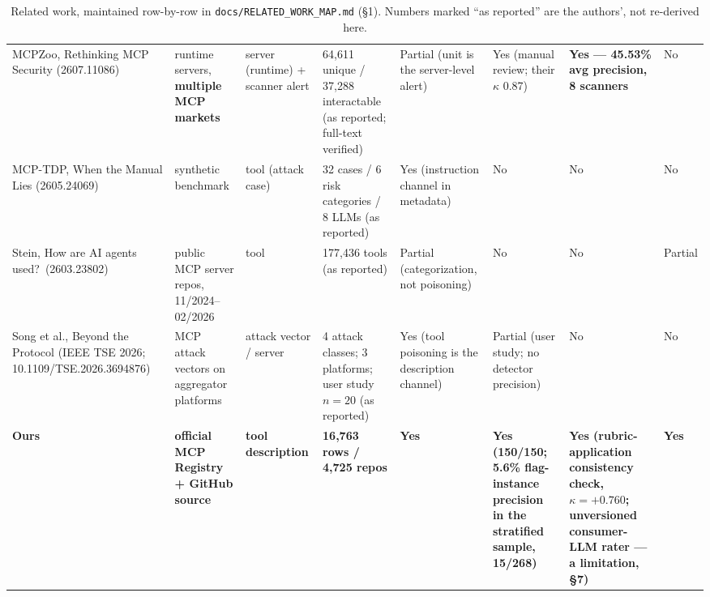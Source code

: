 \documentclass[10pt,conference]{IEEEtran}
\begin{document}
\begin{table}[!t]
\begin{tabular}{@{}p{}p{}p{}p{}p{}p{}p{}p{}@{}}
MCPZoo, Rethinking MCP Security (2607.11086)~\cite{mcpzoo} &
  runtime servers, \textbf{multiple MCP markets} & server (runtime) + scanner alert &
  64,611 unique / 37,288 interactable (as reported; full-text verified) &
  Partial (unit is the server-level alert) & Yes (manual review; their $\kappa$ 0.87) &
  \textbf{Yes --- 45.53\% avg precision, 8 scanners} & No \\
MCP-TDP, When the Manual Lies (2605.24069)~\cite{mcptdp} & synthetic benchmark &
  tool (attack case) & 32 cases / 6 risk categories / 8 LLMs (as reported) &
  Yes (instruction channel in metadata) & No & No & No \\
Stein, How are AI agents used?\ (2603.23802)~\cite{stein} &
  public MCP server repos, 11/2024--02/2026 & tool & 177,436 tools (as reported) &
  Partial (categorization, not poisoning) & No & No & Partial \\
Song et al., Beyond the Protocol (IEEE TSE 2026; 10.1109/TSE.2026.3694876)~\cite{song} &
  MCP attack vectors on aggregator platforms & attack vector / server &
  4 attack classes; 3 platforms; user study $n = 20$ (as reported) &
  Yes (tool poisoning is the description channel) &
  Partial (user study; no detector precision) & No & No \\
\midrule
\textbf{Ours} & \textbf{official MCP Registry + GitHub source} & \textbf{tool description} &
  \textbf{16,763 rows / 4,725 repos} & \textbf{Yes} & \textbf{Yes (150/150; 5.6\% flag-instance precision in the stratified sample, 15/268)} &
  \textbf{Yes (rubric-application consistency check, $\kappa = +0.760$; unversioned
  consumer-LLM rater --- a limitation, \S7)} & \textbf{Yes} \\
\bottomrule
\end{tabular}
\caption{Related work, maintained row-by-row in \texttt{docs/RELATED\_WORK\_MAP.md}
(\S1). Numbers marked ``as reported'' are the authors', not re-derived here.}
\label{tab:related}
\end{table}
\end{document}

